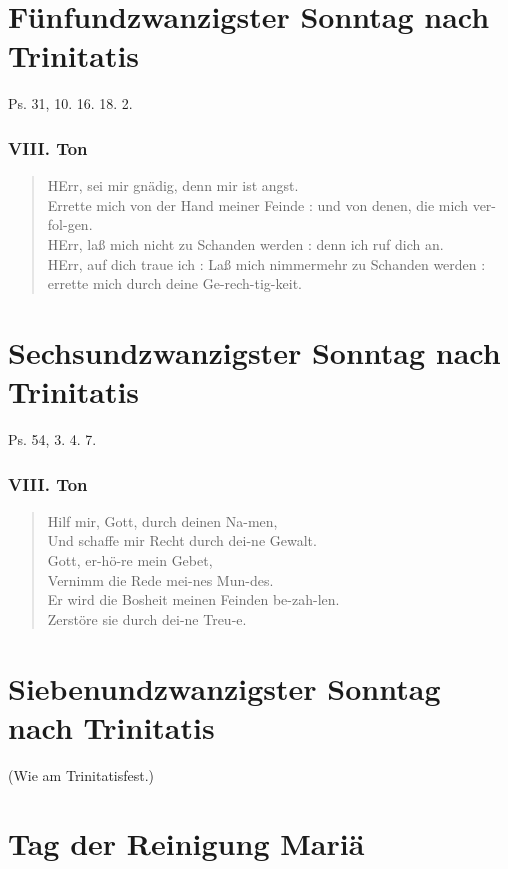 \section[Fünfundzwanzigster Sonntag]{Fünfundzwanzigster Sonntag nach Trinitatis}

Ps. 31, 10. 16. 18. 2.

\subsubsection{VIII. Ton}
\begin{verse}
HErr, sei mir gnädig, denn mir ist angst.\\
Errette mich von der Hand meiner Feinde : und von denen, die mich ver-fol-gen.\\
HErr, laß mich nicht zu Schanden werden : denn ich ruf dich an.\\
HErr, auf dich traue ich : Laß mich nimmermehr zu Schanden werden : errette mich durch deine Ge-rech-tig-keit.
\end{verse}

\section[Sechsundzwanzigster Sonntag]{Sechsundzwanzigster Sonntag nach Trinitatis}

Ps. 54, 3. 4. 7.

\subsubsection{VIII. Ton}
\begin{verse}
Hilf mir, Gott, durch deinen Na-men,\\
Und schaffe mir Recht durch dei-ne Gewalt.\\
Gott, er-hö-re mein Gebet,\\
Vernimm die Rede mei-nes Mun-des.\\
Er wird die Bosheit meinen Feinden be-zah-len.\\
Zerstöre sie durch dei-ne Treu-e.
\end{verse}

\section[Siebenundzwanzigster Sonntag]{Siebenundzwanzigster Sonntag nach Trinitatis}

(Wie am Trinitatisfest.)

\section{Tag der Reinigung Mariä}

